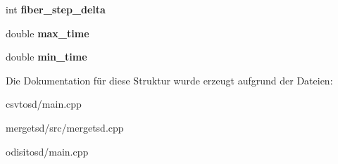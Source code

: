 \begin{DoxyCompactItemize}
\item 
\hypertarget{structOptions_a95547c95448d22efb68da033bf4d9f54}{int {\bfseries fiber\-\_\-step\-\_\-delta}}\label{structOptions_a95547c95448d22efb68da033bf4d9f54}

\item 
\hypertarget{structOptions_a9dce89066bd1386957fd2180ae7128ac}{double {\bfseries max\-\_\-time}}\label{structOptions_a9dce89066bd1386957fd2180ae7128ac}

\item 
\hypertarget{structOptions_aa130a70e2d1d1d1fc8d11366de07c8cb}{double {\bfseries min\-\_\-time}}\label{structOptions_aa130a70e2d1d1d1fc8d11366de07c8cb}

\end{DoxyCompactItemize}


Die Dokumentation für diese Struktur wurde erzeugt aufgrund der Dateien\-:\begin{DoxyCompactItemize}
\item 
csvtosd/main.\-cpp\item 
mergetsd/src/mergetsd.\-cpp\item 
odisitosd/main.\-cpp\end{DoxyCompactItemize}
